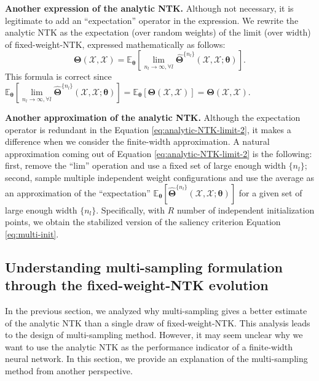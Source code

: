 \documentclass{article} %
\begin{document}
 \textbf{Another expression of the analytic NTK.}
Although not necessary, it is legitimate to add
an ``expectation'' operator in the expression. 
We rewrite the analytic NTK as the expectation (over random weights) of the limit (over width) of  fixed-weight-NTK, expressed mathematically as follows:
\begin{equation}
\label{eq:analytic-NTK-limit-2}
    \boldsymbol{\Theta}(\mathcal{X},\mathcal{X})
=
\mathbb{E}_{\boldsymbol{\theta}}
\left[ \underset{ n_l\rightarrow\infty, \forall l}{\lim}
\hat{\boldsymbol{\Theta}}^{\{n_l\}}(\mathcal{X},\mathcal{X}; \boldsymbol{\theta})\right].
\end{equation}
This formula is correct
since 
$ \mathbb{E}_{\boldsymbol{\theta}} \left[\underset{ n_l\rightarrow\infty, \forall l}{\lim}\hat{\boldsymbol{\Theta}}^{\{n_l\}}(\mathcal{X},\mathcal{X}; \boldsymbol{\theta})\right]
 = \mathbb{E}_{\boldsymbol{\theta}} \left[\boldsymbol{\Theta}(\mathcal{X},\mathcal{X})\right]
  =\boldsymbol{\Theta}(\mathcal{X},\mathcal{X}) $. 

 
  \textbf{Another approximation of the analytic NTK.}
  Although the expectation operator is redundant in 
  the Equation \ref{eq:analytic-NTK-limit-2},
  it makes a difference when we consider the finite-width approximation. 
  A natural approximation coming out of Equation \ref{eq:analytic-NTK-limit-2} is the following:
  first, remove the ``lim'' operation and  use a fixed set of large enough width $\{ n_l \} $; second, sample multiple independent weight configurations and use the average as an approximation of the ``expectation''  $\mathbb{E}_{\boldsymbol{\theta}}\left[\hat{\boldsymbol{\Theta}}^{\{n_l\}}(\mathcal{X},\mathcal{X}; \boldsymbol{\theta})\right] $
for a given set of large enough width $\{ n_l \} $. Specifically, with $R$ number of independent initialization points, we obtain the stabilized version of the saliency criterion Equation \ref{eq:multi-init}.


\subsection{Understanding multi-sampling formulation through the fixed-weight-NTK evolution}
\label{sect:appendix-B2}
In the previous section, we analyzed why multi-sampling gives a better estimate of the analytic NTK than a single draw of fixed-weight-NTK. 
This analysis leads to the design of multi-sampling method. 
However, it may seem unclear why we want to use the analytic NTK as the performance indicator of a finite-width neural network.
In this section, we provide an explanation of the multi-sampling
method from another perspective. 
\end{document}
